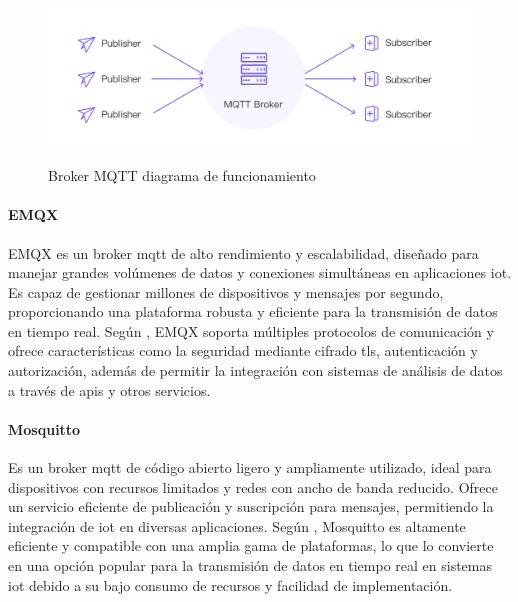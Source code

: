 \begin{figure}[!htb]
   \centering
   \caption{Broker MQTT diagrama de funcionamiento}
   {\includegraphics[scale=0.30]{Figuras/MQTT.png}}\\
\end{figure}

\paragraph{EMQX}

EMQX es un broker \acrshort{mqtt} de alto rendimiento y escalabilidad, diseñado para manejar grandes volúmenes de datos y conexiones simultáneas en aplicaciones \acrshort{iot}. Es capaz de gestionar millones de dispositivos y mensajes por segundo, proporcionando una plataforma robusta y eficiente para la transmisión de datos en tiempo real. Según \cite{emq2020}, EMQX soporta múltiples protocolos de comunicación y ofrece características como la seguridad mediante cifrado \acrshort{tls}, autenticación y autorización, además de permitir la integración con sistemas de análisis de datos a través de \acrshort{api}s y otros servicios.

\paragraph{Mosquitto}
Es un broker \acrshort{mqtt} de código abierto ligero y ampliamente utilizado, ideal para dispositivos con recursos limitados y redes con ancho de banda reducido. Ofrece un servicio eficiente de publicación y suscripción para mensajes, permitiendo la integración de \acrshort{iot} en diversas aplicaciones. Según \cite{carleton2018mosquitto}, Mosquitto es altamente eficiente y compatible con una amplia gama de plataformas, lo que lo convierte en una opción popular para la transmisión de datos en tiempo real en sistemas \acrshort{iot} debido a su bajo consumo de recursos y facilidad de implementación.

